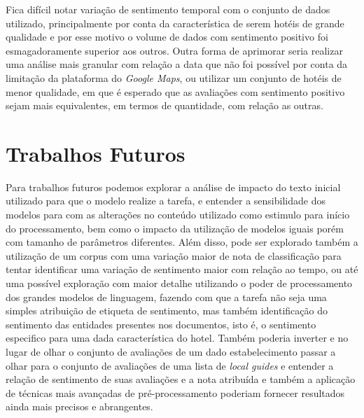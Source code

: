 Fica difícil notar variação de sentimento temporal com o conjunto de dados utilizado, principalmente por conta da característica de serem hotéis de grande qualidade e por esse motivo o volume de dados com sentimento positivo foi esmagadoramente superior aos outros. Outra forma de aprimorar seria realizar uma análise mais granular com relação a data que não foi possível por conta da limitação da plataforma do \textit{Google Maps}, ou utilizar um conjunto de hotéis de menor qualidade, em que é esperado que as avaliações com sentimento positivo sejam mais equivalentes, em termos de quantidade, com relação as outras.

\section{Trabalhos Futuros}
\label{cap:conclusao:sec:trab_futuros}

Para trabalhos futuros podemos explorar a análise de impacto do texto inicial utilizado para que o modelo realize a tarefa, e entender a sensibilidade dos modelos para com as alterações no conteúdo utilizado como estimulo para início do processamento, bem como o impacto da utilização de modelos iguais porém com tamanho de parâmetros diferentes. Além disso, pode ser explorado também a utilização de um corpus com uma variação maior de nota de classificação para tentar identificar uma variação de sentimento maior com relação ao tempo, ou até uma possível exploração com maior detalhe utilizando o poder de processamento dos grandes modelos de linguagem, fazendo com que a tarefa não seja uma simples atribuição de etiqueta de sentimento, mas também identificação do sentimento das entidades presentes nos documentos, isto é, o sentimento especifico para uma dada característica do hotel. Também poderia inverter e no lugar de olhar o conjunto de avaliações de um dado estabelecimento passar a olhar para o conjunto de avaliações de uma lista de \textit{local guides} e entender a relação de sentimento de suas avaliações e a nota atribuída e também a aplicação de técnicas mais avançadas de pré-processamento poderiam fornecer resultados ainda mais precisos e abrangentes.
